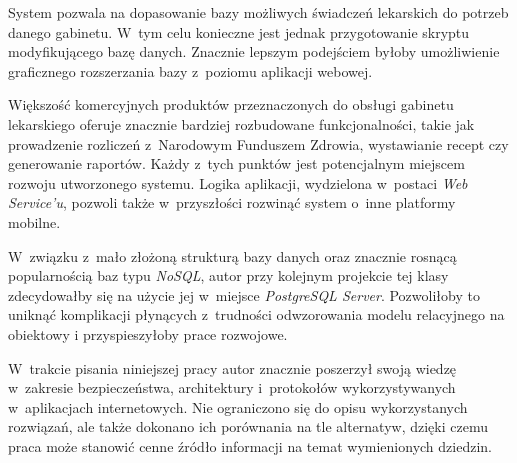 \documentclass[11pt]{aghdpl}
\begin{document}
System pozwala na dopasowanie bazy możliwych świadczeń lekarskich do potrzeb danego gabinetu. W~tym celu konieczne jest jednak przygotowanie skryptu modyfikującego bazę danych. Znacznie lepszym podejściem byłoby umożliwienie graficznego rozszerzania bazy z~poziomu aplikacji webowej.

Większość komercyjnych produktów przeznaczonych do obsługi gabinetu lekarskiego oferuje znacznie bardziej rozbudowane funkcjonalności, takie jak prowadzenie rozliczeń z~Narodowym Funduszem Zdrowia, wystawianie recept czy generowanie raportów. Każdy z~tych punktów jest potencjalnym miejscem rozwoju utworzonego systemu. Logika aplikacji, wydzielona w~postaci \emph{Web Service'u}, pozwoli także w~przyszłości rozwinąć system o~inne platformy mobilne.

W~związku z~mało złożoną strukturą bazy danych oraz znacznie rosnącą popularnością baz typu \emph{NoSQL}, autor przy kolejnym projekcie tej klasy zdecydowałby się na użycie jej w~miejsce \emph{PostgreSQL Server}. Pozwoliłoby to uniknąć komplikacji płynących z~trudności odwzorowania modelu relacyjnego na obiektowy i przyspieszyłoby prace rozwojowe.

W~trakcie pisania niniejszej pracy autor znacznie poszerzył swoją wiedzę w~zakresie bezpieczeństwa, architektury i~protokołów wykorzystywanych w~aplikacjach internetowych. Nie ograniczono się do opisu wykorzystanych rozwiązań, ale także dokonano ich porównania na tle alternatyw, dzięki czemu praca może stanowić cenne źródło informacji na temat wymienionych dziedzin.

% 
% 



\end{document}

